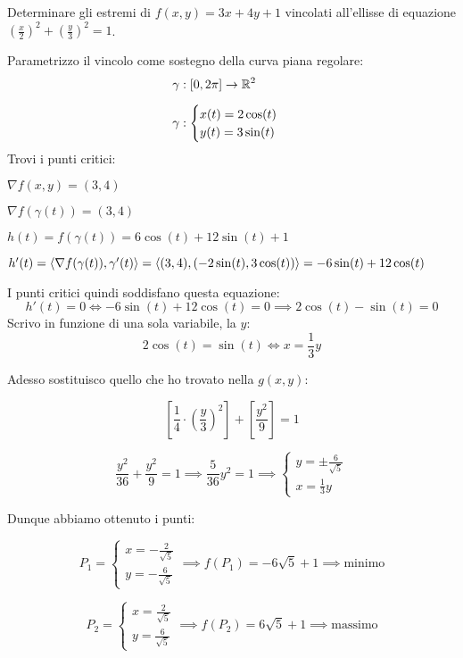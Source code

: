 Determinare gli estremi di \(f(x,y) = 3x + 4y +1\) vincolati all'ellisse di equazione \({\left(\frac{x}{2}\right)}^{2}+ {\left(\frac{y}{3}\right)}^{2}=1\).

Parametrizzo il vincolo come sostegno della curva piana regolare:
\begin{align*}
     & \gamma: [0,2\pi] \to \mathbb{R}^2 \\[2mm]
     & \gamma: \begin{cases}
                   x(t) = 2 \cos(t) \\
                   y(t) = 3 \sin(t)
               \end{cases}
\end{align*}
Trovi i punti critici:

\vspace{3mm}
\(\nabla f(x,y) = (3,4)\)

\(\nabla f(\gamma(t)) = (3,4)\)

\(h(t) = f(\gamma(t)) = 6 \cos(t) + 12 \sin(t) + 1\)

\(h'(t) = \langle\nabla f(\gamma(t)),\gamma'(t)\rangle = \langle(3,4),(-2\sin(t),3\cos(t))\rangle = -6 \sin(t) + 12 \cos(t)\)
\vspace{3mm}

I punti critici quindi soddisfano questa equazione:
\[
    h'(t) = 0 \iff -6 \sin(t) + 12 \cos(t) = 0 \implies 2 \cos(t) - \sin(t) = 0
\]
Scrivo in funzione di una sola variabile, la \(y\):
\[
    2 \cos(t) = \sin(t) \iff x = \frac{1}{3}y
\]

Adesso sostituisco quello che ho trovato nella \(g(x,y)\):

\[
    \left[ \frac{1}{4} \cdot {\left(\frac{y}{3}\right)}^{2} \right] + \left[ \frac{y^{2}}{9} \right] = 1
\]

\[
    \frac{y^{2}}{36} + \frac{y^{2}}{9} = 1
    \implies
    \frac{5}{36} y^{2} = 1
    \implies
    \begin{cases*}
        y = \pm \frac{6}{\sqrt{5}} \\
        x = \frac{1}{3}y
    \end{cases*}
\]

Dunque abbiamo ottenuto i punti:

\[
    P_1=\begin{cases}
        x= - \frac{2}{\sqrt{5}} \\
        y = -\frac{6}{\sqrt{5}}
    \end{cases}
    \implies
    f(P_1) = -6 \sqrt{5} + 1
    \implies
    \text{minimo}
\]

\[
    P_2=\begin{cases}
        x = \frac{2}{\sqrt{5}} \\
        y = \frac{6}{\sqrt{5}}
    \end{cases}
    \implies
    f(P_2) = 6 \sqrt{5} + 1
    \implies
    \text{massimo}
\]

